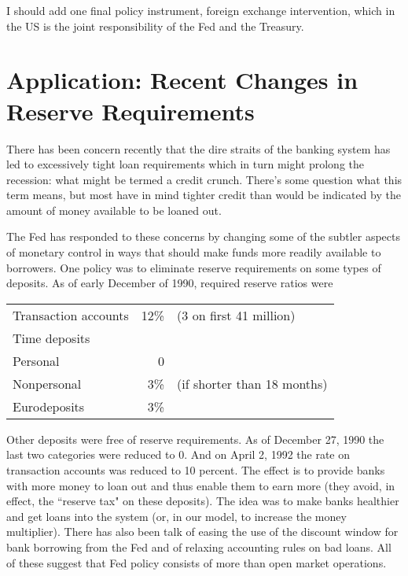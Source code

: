 \documentclass[letterpaper,12pt]{article}
\begin{document}
     I should add one final policy instrument, foreign exchange intervention,
which in the US is the joint responsibility of the Fed and the Treasury.

\section{Application:  Recent Changes in Reserve Requirements}

     There has been concern recently that the dire straits of the banking
system has led to excessively tight loan requirements which in turn might prolong the recession:
what might be termed a credit crunch.  There's some question what this term means, but most have
in mind tighter credit than would be indicated by the amount of money available to be loaned out.

     The Fed has responded to these concerns by changing some of the subtler
aspects of monetary control in ways that should make funds more readily available to borrowers.
One policy was to eliminate reserve requirements on some types of deposits.  As of early December
of 1990, required reserve ratios were
%
\begin{center}
\begin{tabular}{lrl}
          Transaction accounts   &  12\%  & (3 on first 41 million)  \\
          Time deposits            \\
  \hspace{0.25in} Personal       &   0                                \\
  \hspace{0.25in} Nonpersonal    &   3\%   & (if shorter than 18 months) \\
          Eurodeposits           &   3\%   \\
\end{tabular}
\end{center}
%
Other deposits were free of reserve requirements.  As of December 27, 1990 the last two categories
were reduced to 0.  And on April 2, 1992 the rate on transaction accounts was reduced to 10
percent.  The effect is to provide banks with more money to loan out and thus enable them to earn
more (they avoid, in effect, the ``reserve tax" on these deposits).  The idea was to make banks
healthier and get loans into the system (or, in our model, to increase the money multiplier).
There has also been talk of easing the use of the discount window for bank borrowing from the Fed
and of relaxing accounting rules on bad loans.  All of these suggest that Fed policy consists of
more than open market operations.
\end{document}
